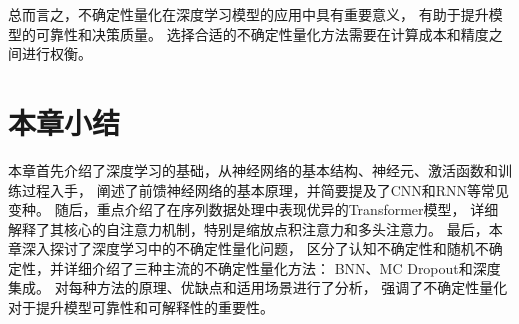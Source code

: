 总而言之，不确定性量化在深度学习模型的应用中具有重要意义，
有助于提升模型的可靠性和决策质量。
选择合适的不确定性量化方法需要在计算成本和精度之间进行权衡。

\section{本章小结}

本章首先介绍了深度学习的基础，从神经网络的基本结构、神经元、激活函数和训练过程入手，
阐述了前馈神经网络的基本原理，并简要提及了CNN和RNN等常见变种。
随后，重点介绍了在序列数据处理中表现优异的Transformer模型，
详细解释了其核心的自注意力机制，特别是缩放点积注意力和多头注意力。
最后，本章深入探讨了深度学习中的不确定性量化问题，
区分了认知不确定性和随机不确定性，并详细介绍了三种主流的不确定性量化方法：
BNN、MC Dropout和深度集成。
对每种方法的原理、优缺点和适用场景进行了分析，
强调了不确定性量化对于提升模型可靠性和可解释性的重要性。

